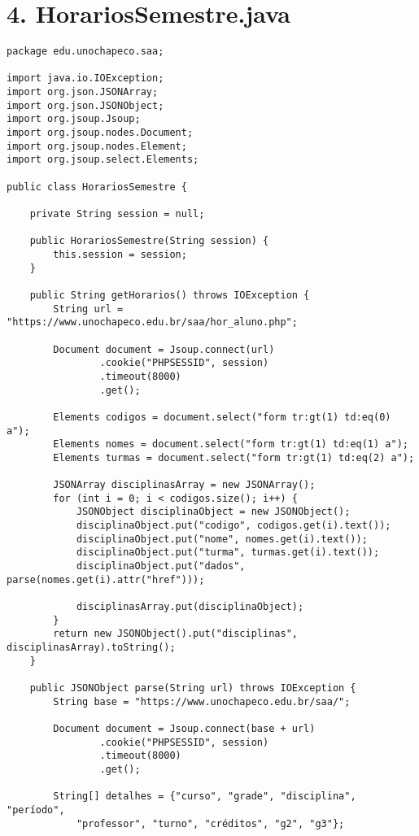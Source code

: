\section*{4. HorariosSemestre.java}

\begin{lstlisting}
package edu.unochapeco.saa;

import java.io.IOException;
import org.json.JSONArray;
import org.json.JSONObject;
import org.jsoup.Jsoup;
import org.jsoup.nodes.Document;
import org.jsoup.nodes.Element;
import org.jsoup.select.Elements;

public class HorariosSemestre {

    private String session = null;

    public HorariosSemestre(String session) {
        this.session = session;
    }

    public String getHorarios() throws IOException {
        String url = "https://www.unochapeco.edu.br/saa/hor_aluno.php";

        Document document = Jsoup.connect(url)
                .cookie("PHPSESSID", session)
                .timeout(8000)
                .get();

        Elements codigos = document.select("form tr:gt(1) td:eq(0) a");
        Elements nomes = document.select("form tr:gt(1) td:eq(1) a");
        Elements turmas = document.select("form tr:gt(1) td:eq(2) a");

        JSONArray disciplinasArray = new JSONArray();
        for (int i = 0; i < codigos.size(); i++) {
            JSONObject disciplinaObject = new JSONObject();
            disciplinaObject.put("codigo", codigos.get(i).text());
            disciplinaObject.put("nome", nomes.get(i).text());
            disciplinaObject.put("turma", turmas.get(i).text());
            disciplinaObject.put("dados", parse(nomes.get(i).attr("href")));

            disciplinasArray.put(disciplinaObject);
        }
        return new JSONObject().put("disciplinas", disciplinasArray).toString();
    }

    public JSONObject parse(String url) throws IOException {
        String base = "https://www.unochapeco.edu.br/saa/";

        Document document = Jsoup.connect(base + url)
                .cookie("PHPSESSID", session)
                .timeout(8000)
                .get();

        String[] detalhes = {"curso", "grade", "disciplina", "período",
            "professor", "turno", "créditos", "g2", "g3"};


\end{lstlisting}
